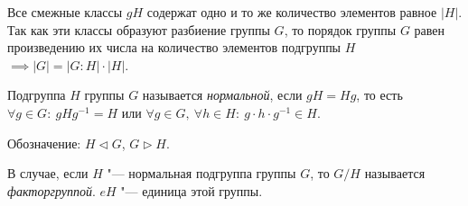 \begin{Proof}
  Все смежные классы $gH$ содержат одно и то же количество элементов равное $\mathopen|H\mathclose|$. Так как эти классы образуют разбиение группы $G$, то порядок группы $G$ равен произведению их числа на количество элементов подгруппы $H$ $\implies \mathopen|G\mathclose| = \mathopen|G:H\mathclose| \cdot \mathopen|H\mathclose|$.
\end{Proof}

\begin{definition}
  Подгруппа $H$ группы $G$ называется \textit{нормальной}, если $gH=Hg$, то есть $\forall g \in G:~ gHg^{-1} = H$ или $\forall g \in G, ~ \forall h \in H: ~ g \cdot h \cdot g^{-1} \in H$.

  Обозначение: $H \lhd G$, $G \rhd H$.
\end{definition}
В случае, если $H$ "--- нормальная  подгруппа группы $G$, то $G / H$ называется \textit{факторгруппой}.
$eH$ "--- единица этой группы.

